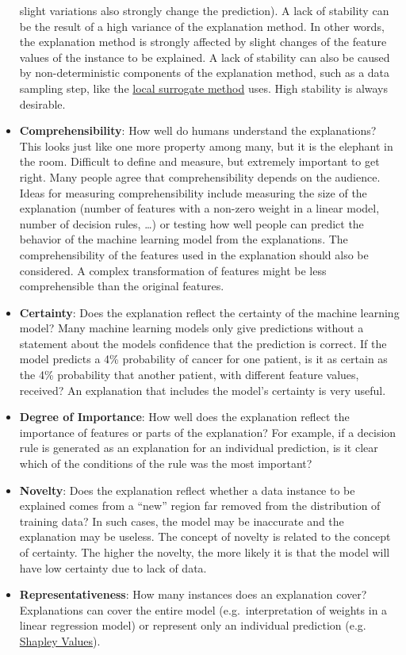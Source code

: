 \documentclass[12pt,]{krantz}
\begin{document}
\begin{itemize}
  slight variations also strongly change the prediction). A lack of
  stability can be the result of a high variance of the explanation
  method. In other words, the explanation method is strongly affected by
  slight changes of the feature values of the instance to be explained.
  A lack of stability can also be caused by non-deterministic components
  of the explanation method, such as a data sampling step, like the
  \protect\hyperlink{lime}{local surrogate method} uses. High stability
  is always desirable.
\item
  \textbf{Comprehensibility}: How well do humans understand the
  explanations? This looks just like one more property among many, but
  it is the elephant in the room. Difficult to define and measure, but
  extremely important to get right. Many people agree that
  comprehensibility depends on the audience. Ideas for measuring
  comprehensibility include measuring the size of the explanation
  (number of features with a non-zero weight in a linear model, number
  of decision rules, \ldots{}) or testing how well people can predict
  the behavior of the machine learning model from the explanations. The
  comprehensibility of the features used in the explanation should also
  be considered. A complex transformation of features might be less
  comprehensible than the original features.
\item
  \textbf{Certainty}: Does the explanation reflect the certainty of the
  machine learning model? Many machine learning models only give
  predictions without a statement about the models confidence that the
  prediction is correct. If the model predicts a 4\% probability of
  cancer for one patient, is it as certain as the 4\% probability that
  another patient, with different feature values, received? An
  explanation that includes the model's certainty is very useful.
\item
  \textbf{Degree of Importance}: How well does the explanation reflect
  the importance of features or parts of the explanation? For example,
  if a decision rule is generated as an explanation for an individual
  prediction, is it clear which of the conditions of the rule was the
  most important?
\item
  \textbf{Novelty}: Does the explanation reflect whether a data instance
  to be explained comes from a ``new'' region far removed from the
  distribution of training data? In such cases, the model may be
  inaccurate and the explanation may be useless. The concept of novelty
  is related to the concept of certainty. The higher the novelty, the
  more likely it is that the model will have low certainty due to lack
  of data.
\item
  \textbf{Representativeness}: How many instances does an explanation
  cover? Explanations can cover the entire model (e.g.~interpretation of
  weights in a linear regression model) or represent only an individual
  prediction (e.g. \protect\hyperlink{shapley}{Shapley Values}).
\end{itemize}
\end{document}
